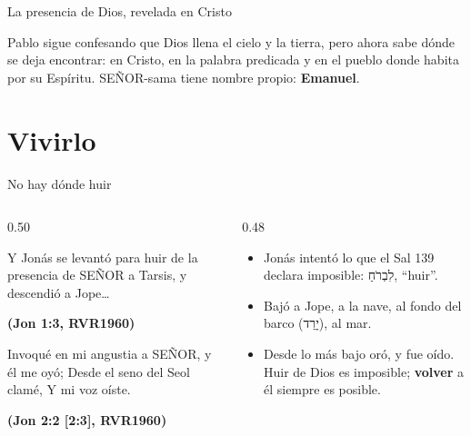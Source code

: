 \documentclass[hyperref={bookmarks=false},aspectratio=169]{beamer}
\newcommand{\heb}[1]{\mbox{\foreignlanguage{hebrew}{#1}}}
\newcommand{\SENOR}{S{\fontsize{0.78em}{1em}\selectfont EÑOR}}
\newcommand{\fuente}[1]{\par\hfill{\upshape\bfseries\footnotesize\textcolor{azul}{#1}}}
\newcommand{\destacar}[1]{\textbf{\textcolor{azul}{#1}}}
\begin{document}
\begin{frame}{La presencia de Dios, revelada en Cristo}
\centering
{}\par\medskip
\small\RaggedRight Pablo sigue confesando que Dios llena el cielo y la tierra, pero ahora sabe dónde se deja encontrar: en Cristo, en la palabra predicada y en el pueblo donde habita por su Espíritu. \SENOR-sama tiene nombre propio: \destacar{Emanuel}.
\end{frame}

\section{Vivirlo}

\begin{frame}{No hay dónde huir}
\begin{columns}[t,onlytextwidth]
\begin{column}{0.50\textwidth}
\begin{cita}[fontupper=\scriptsize\itshape]Y Jonás se levantó para huir de la presencia de \SENOR{} a Tarsis, y descendió a Jope\ldots\fuente{(Jon 1:3, RVR1960)}\end{cita}
\begin{cita}[fontupper=\scriptsize\itshape]Invoqué en mi angustia a \SENOR, y él me oyó; Desde el seno del Seol clamé, Y mi voz oíste.\fuente{(Jon 2:2 [2:3], RVR1960)}\end{cita}
\end{column}
\begin{column}{0.48\textwidth}\small
\begin{itemize}
\item Jonás intentó lo que el Sal 139 declara imposible: \heb{לִבְרֹחַ}, ``huir''.
\item Bajó a Jope, a la nave, al fondo del barco (\heb{יָרַד}), al mar.
\item Desde lo más bajo oró, y fue oído. Huir de Dios es imposible; \destacar{volver} a él siempre es posible.
\end{itemize}
\end{column}
\end{columns}
\end{frame}
\end{document}
